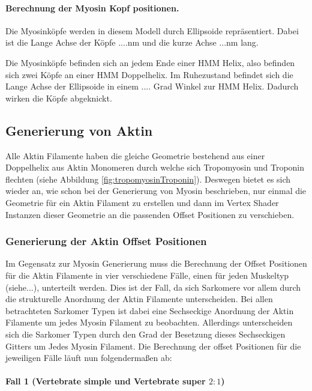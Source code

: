 \documentclass[a4paper,m]{cgBA}
\begin{document}
\paragraph{Berechnung der Myosin Kopf positionen.}

Die Myosinköpfe werden in diesem Modell durch Ellipsoide repräsentiert.
Dabei ist die Lange Achse der Köpfe \(....\)nm und die kurze Achse  \(...\)nm lang.

Die Myosinköpfe befinden sich an jedem Ende einer HMM Helix, also befinden sich zwei Köpfe an einer HMM Doppelhelix.
Im Ruhezustand befindet sich die Lange Achse der Ellipsoide in einem \(....\) Grad Winkel zur HMM Helix. Dadurch wirken die Köpfe abgeknickt.

\subsection{Generierung von Aktin}
Alle Aktin Filamente haben die gleiche Geometrie bestehend aus einer Doppelhelix aus Aktin Monomeren durch welche sich Tropomyosin und Troponin flechten (siehe Abbildung \ref{fig:tropomyosinTroponin}). Deswegen bietet es sich wieder an, wie schon bei der Generierung von Myosin beschrieben, nur einmal die Geometrie für ein Aktin Filament zu erstellen und dann im Vertex Shader Instanzen dieser Geometrie an die passenden Offset Positionen zu verschieben.

\subsubsection{Generierung der Aktin Offset Positionen}
Im Gegensatz zur Myosin Generierung muss die Berechnung der Offset Positionen für die Aktin Filamente in vier verschiedene Fälle, einen für jeden Muskeltyp (siehe...), unterteilt werden.
Dies ist der Fall, da sich Sarkomere vor allem durch die strukturelle Anordnung der Aktin Filamente unterscheiden.
Bei allen betrachteten Sarkomer Typen ist dabei eine Sechseckige Anordnung der Aktin Filamente um jedes Myosin Filament zu beobachten. Allerdings unterscheiden sich die Sarkomer Typen durch den Grad der Besetzung dieses Sechseckigen Gitters um Jedes Myosin Filament.
Die Berechnung der offset Positionen für die jeweiligen Fälle läuft nun folgendermaßen ab: 
\paragraph{Fall 1 (Vertebrate simple und Vertebrate super \(2:1\))}
\end{document}
